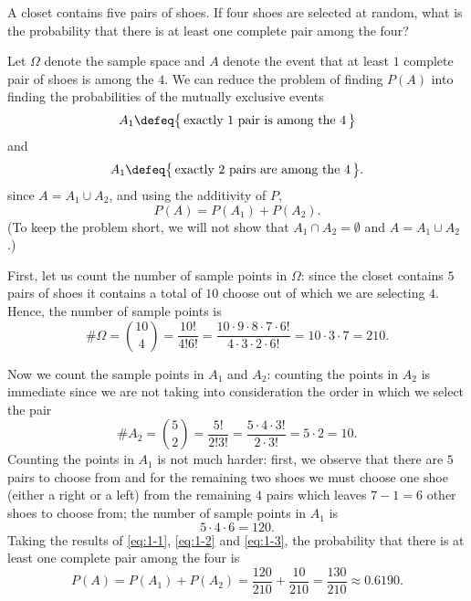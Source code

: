 \begin{problem}
  A closet contains five pairs of shoes. If four shoes are selected at
  random, what is the probability that there is at least one complete pair
  among the four?
\end{problem}
\begin{solution}
  Let \(\Omega\) denote the sample space and \(A\) denote the event that at
  least \(1\) complete pair of shoes is among the \(4\). We can reduce the
  problem of finding \(P(A)\) into finding the probabilities of the
  mutually exclusive events
 \[
   A_1\defeq\bigl\{\,\text{exactly \(1\) pair is among the \(4\)}\,\bigr\}
  \]
  and
  \[
    A_1\defeq\bigl\{\,\text{exactly \(2\) pairs are among the
      \(4\)}\,\bigr\}.
  \]
  since \(A=A_1\cup A_2\), and using the additivity of \(P\),
  \[
    P(A)=P(A_1)+P(A_2).
  \]
  (To keep the problem short, we will not show that
  \(A_1\cap A_2=\emptyset\) and \(A=A_1\cup A_2\).)

  First, let us count the number of sample points in \(\Omega\): since the
  closet contains \(5\) pairs of shoes it contains a total of \(10\) choose
  out of which we are selecting \(4\). Hence, the number of sample points
  is
  \begin{equation}
    \label{eq:1-1}
    \#\Omega=%
    \binom{10}{4}=%
    \frac{10!}{4!6!}=%
    \frac{10\cdot 9\cdot 8\cdot 7\cdot 6!}{4\cdot 3\cdot 2\cdot 6!}=%
    10\cdot 3\cdot 7=%
    210.
  \end{equation}

  Now we count the sample points in \(A_1\) and \(A_2\): counting the
  points in \(A_2\) is immediate since we are not taking into consideration
  the order in which we select the pair
  \begin{equation}
    \label{eq:1-2}
    \# A_2=%
    \binom{5}{2}=%
    \frac{5!}{2!3!}=%
    \frac{5\cdot 4\cdot 3!}{2\cdot 3!}=%
    5\cdot 2=10.
  \end{equation}
  Counting the points in \(A_1\) is not much harder:
  first, we observe that there are \(5\) pairs to
  choose from and for the remaining two shoes we must choose one shoe
  (either a right or a left) from the remaining \(4\) pairs which leaves
  \(7-1=6\) other shoes to choose from; \ie{} the number of sample points
  in \(A_1\) is
  \begin{equation}
    \label{eq:1-3}
    5\cdot 4\cdot 6=120.
  \end{equation}
  Taking the results of \eqref{eq:1-1}, \eqref{eq:1-2} and \eqref{eq:1-3},
  the probability that there is at least one complete pair among the four
  is
  \[
    P(A)=%
    P(A_1)+P(A_2)=%
    \frac{120}{210}+\frac{10}{210}=\frac{130}{210}\approx%
    0.6190.
  \]
\end{solution}
\newpage

